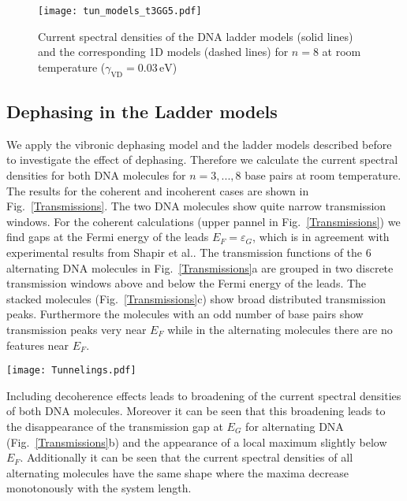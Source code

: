 \documentclass[reprint,superscriptaddress,nofootinbib,amsmath,amssymb,prb,floatfix]{revtex4-1}
\begin{document}
\begin{figure}[t]
 \texttt{[image: tun\_models\_t3GG5.pdf]}
  \caption{Current spectral densities of the DNA ladder models (solid lines) and the corresponding 1D models (dashed lines) for $n = 8$ at room temperature ($\gamma_\text{VD} = 0.03\,\text{eV}$)}
 \label{Tunneling_Models}
\end{figure}

\subsection{Dephasing in the Ladder models}
 
We apply the vibronic dephasing model and the ladder models described before to investigate the
effect of dephasing. Therefore we calculate the current spectral densities for both DNA molecules
for $n=3,...,8$ base pairs at room temperature. The results for the coherent and incoherent cases
are shown in Fig.~\ref{Transmissions}.  The two DNA molecules show quite narrow transmission
windows. For the coherent calculations (upper pannel in Fig.~\ref{Transmissions}) we find gaps at
the Fermi energy of the leads $E_F = \varepsilon_G$, which is in agreement with experimental results
from Shapir et al.\cite{shapir_electronic_2007,Ryndyk09acsnano}. The transmission functions of the 6 alternating DNA
molecules in Fig.~\ref{Transmissions}a are grouped in two discrete transmission windows above and
below the Fermi energy of the leads. The stacked molecules (Fig.~\ref{Transmissions}c) show broad
distributed transmission peaks. Furthermore the molecules with an odd number of base pairs show
transmission peaks very near $E_F$ while in the alternating molecules there are no features near
$E_F$.

\begin{figure*}
  \texttt{[image: Tunnelings.pdf]}
  \caption{Current spectral densities calculated using the ladder models at room temperature ($T = 295\,\text{K}$).
Left panel: Alternating A(CG)$_n$T DNA for a) coherent case and b) case with dephasing. 
Right panel: Stacked AC$_n$G$_n$T c) coherent case and d) case with dephasing.
Dashed lines indicated the position of the Fermi energy of the leads $E_F = \varepsilon_G$}
  \label{Transmissions}
\end{figure*}

Including decoherence effects leads to broadening of the current spectral densities of both DNA
molecules. Moreover it can be seen that this broadening leads to the disappearance of the
transmission gap at $E_G$ for alternating DNA (Fig.~\ref{Transmissions}b) and the appearance of a
local maximum slightly below $E_F$.  Additionally it can be seen that the current spectral densities
of all alternating molecules have the same shape where the maxima decrease monotonously with the
system length.
\end{document}
